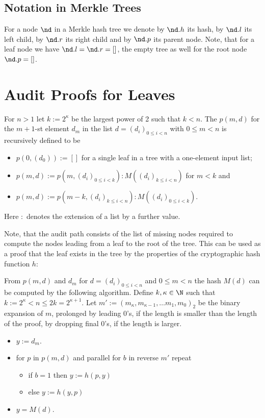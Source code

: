 \subsection{Notation in Merkle Trees}
For a node \(\nd\) in a Merkle hash tree we denote
by \(\nd.h\) its hash, by \(\nd.l\) its left child, 
by \(\nd.r\) its right child and by 
\(\nd.p\) its parent node. Note, that for a leaf
node we have \(\nd.l = \nd.r = []\), the empty tree
as well for the root node \(\nd.p = []\).


\section{Audit Proofs for Leaves}

\begin{definition}
For \(n > 1\) let \(k := 2^\kappa\) be the largest 
power of 2 such that \(k < n\). The  \(p(m, d)\) for 
the \(m+1\)-st element \(d_m\) in the list \(d = (d_i)_{0 \le i < n}\)
with \(0 \le m < n\) is recursively defined to be 
\begin{itemize}
\item \(p(0,(d_0)) := []\) for a single leaf in a tree with a one-element
input list;
\item \(p(m,d) := p(m, (d_i)_{0 \le i < k}) : M( (d_i)_{k \le i < n} )\) for \(m < k\) and
\item \(p(m,d) := p(m-k, (d_i)_{k \le i < n}) : M( (d_i)_{0 \le i < k})  \). 
\end{itemize}
Here \(:\) denotes the extension of a list by a further value.
\end{definition}
Note, that the audit path consists of the list of missing
nodes required to compute the nodes leading from 
a leaf to the root of the tree.
This can be used as a proof that the leaf exists in the tree by the 
properties of the cryptographic hash function \(h\):
\begin{theorem}
From \(p(m,d)\) and \(d_m\) for \(d = (d_i)_{0 \le i < n}\)
and \(0 \le m < n\) the hash \(M(d)\) can be 
computed by the following algorithm. 
Define \(k, \kappa \in \N\) such that \(k := 2^\kappa < n \le 2k = 2^{\kappa+1}.\)
Let \(m' := (m_\kappa,m_{\kappa-1},\ldots m_1,m_0)_2\) be the binary
expansion of \(m\), prolonged by leading 0's, if the length
is smaller than the length of the proof, by dropping final 0's, if the
length is larger.
\begin{itemize}
\item \(y := d_m\).
\item for \(p\) in \(p(m,d)\) and parallel for \(b\) in reverse \(m'\) repeat
	\begin{itemize}
		\item if \(b=1\) then \(y := h(p,y)\)
		\item else \(y := h(y, p)\)
	\end{itemize}
\item \(y = M(d)\).
\end{itemize}
\end{theorem}
